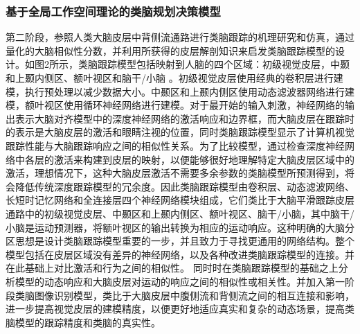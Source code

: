 \documentclass[a4paper,zihao=-4]{article}
\begin{document}
\subsubsection{基于全局工作空间理论的类脑规划决策模型}
第二阶段，参照人类大脑皮层中背侧流通路进行类脑跟踪的机理研究和仿真，通过量化的大脑相似性分数，并利用所获得的皮层解剖知识来启发类脑跟踪模型的设计。如图2所示，类脑跟踪模型包括映射到人脑的四个区域：初级视觉皮层，中颞和上颞内侧区、额叶视区和脑干/小脑 。初级视觉皮层使用经典的卷积层进行建模，执行预处理以减少数据大小。中颞区和上颞内侧区使用动态滤波器网络进行建模，额叶视区使用循环神经网络进行建模。对于最开始的输入刺激，神经网络的输出表示大脑对齐模型中的深度神经网络的激活响应和边界框，而大脑皮层在跟踪时的表示是大脑皮层的激活和眼睛注视的位置，同时类脑跟踪模型显示了计算机视觉跟踪性能与大脑跟踪响应之间的相似性关系。为了比较模型，通过检查深度神经网络中各层的激活来构建到皮层的映射，以便能够很好地理解特定大脑皮层区域中的激活，理想情况下，这种大脑皮层激活不需要多余参数的类脑模型所预测得到，将会降低传统深度跟踪模型的冗余度。因此类脑跟踪模型由卷积层、动态滤波网络、长短时记忆网络和全连接层四个神经网络模块组成，它们类比于大脑平滑跟踪皮层通路中的初级视觉皮层、中颞区和上颞内侧区、额叶视区、脑干/小脑，其中脑干/小脑是运动预测器，将额叶视区的输出转换为相应的运动响应。这种明确的大脑分区思想是设计类脑跟踪模型重要的一步，并且致力于寻找更通用的网络结构。整个模型包括在皮层区域没有差异的神经网络，以及各种改进类脑跟踪模型的连接。并在此基础上对比激活和行为之间的相似性。
同时时在类脑跟踪模型的基础之上分析模型的动态响应和大脑皮层对运动的响应之间的相似性或相关性。并加入第一阶段类脑图像识别模型，类比于大脑皮层中腹侧流和背侧流之间的相互连接和影响，进一步提高视觉皮层的建模精度，以便更好地适应真实和复杂的动态场景，提高类脑模型的跟踪精度和类脑的真实性。
\end{document}
